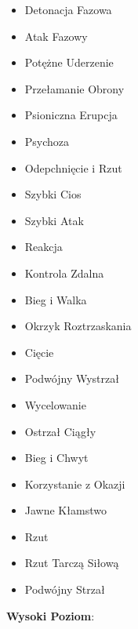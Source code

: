 \begin{itemize}
\item Detonacja Fazowa
\item Atak Fazowy
\item Potężne Uderzenie
\item Przełamanie Obrony
\item Psioniczna Erupcja
\item Psychoza
\item Odepchnięcie i Rzut
\item Szybki Cios
\item Szybki Atak
\item Reakcja
\item Kontrola Zdalna
\item Bieg i Walka
\item Okrzyk Roztrzaskania
\item Cięcie
\item Podwójny Wystrzał
\item Wycelowanie
\item Ostrzał Ciągły
\item Bieg i Chwyt
\item Korzystanie z Okazji
\item Jawne Kłamstwo
\item Rzut
\item Rzut Tarczą Siłową
\item Podwójny Strzał
\end{itemize}

\textbf{Wysoki Poziom}:

